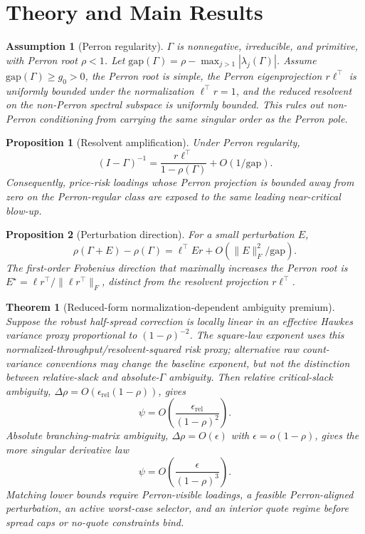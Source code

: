 \documentclass[11pt]{article}
\newtheorem{theorem}{Theorem}
\newtheorem{proposition}{Proposition}
\newtheorem{assumption}{Assumption}
\begin{document}
\section{Theory and Main Results}

\begin{assumption}[Perron regularity]
$\Gamma$ is nonnegative, irreducible, and primitive, with Perron root
$\rho<1$. Let
$\mathrm{gap}(\Gamma)=\rho-\max_{j>1}|\lambda_j(\Gamma)|$.
Assume $\mathrm{gap}(\Gamma)\ge g_0>0$, the Perron root is simple, the Perron
eigenprojection $r\ell^\top$ is uniformly bounded under the normalization
$\ell^\top r=1$, and the reduced resolvent on the non-Perron spectral subspace
is uniformly bounded. This rules out non-Perron conditioning from carrying the
same singular order as the Perron pole.
\end{assumption}

\begin{proposition}[Resolvent amplification]
Under Perron regularity,
\[
(I-\Gamma)^{-1}
 =
\frac{r\ell^\top}{1-\rho(\Gamma)} + O(1/\mathrm{gap}).
\]
Consequently, price-risk loadings whose Perron projection is bounded away from
zero on the Perron-regular class are exposed to the same leading near-critical
blow-up.
\end{proposition}

\begin{proposition}[Perturbation direction]
For a small perturbation $E$,
\[
\rho(\Gamma+E)-\rho(\Gamma)
 =
\ell^\top E r + O(\|E\|_F^2/\mathrm{gap}).
\]
The first-order Frobenius direction that maximally increases the Perron root is
$E^\star=\ell r^\top/\|\ell r^\top\|_F$, distinct from the resolvent projection
$r\ell^\top$.
\end{proposition}

\begin{theorem}[Reduced-form normalization-dependent ambiguity premium]
Suppose the robust half-spread correction is locally linear in an effective
Hawkes variance proxy proportional to $(1-\rho)^{-2}$. The square-law exponent
uses this normalized-throughput/resolvent-squared risk proxy; alternative raw
count-variance conventions may change the baseline exponent, but not the
distinction between relative-slack and absolute-$\Gamma$ ambiguity. Then relative
critical-slack
ambiguity, $\Delta\rho=O(\epsilon_{\mathrm{rel}}(1-\rho))$, gives
\[
\psi = O\!\left(\frac{\epsilon_{\mathrm{rel}}}{(1-\rho)^2}\right).
\]
Absolute branching-matrix ambiguity, $\Delta\rho=O(\epsilon)$ with
$\epsilon=o(1-\rho)$, gives the more singular derivative law
\[
\psi = O\!\left(\frac{\epsilon}{(1-\rho)^3}\right).
\]
Matching lower bounds require Perron-visible loadings, a feasible
Perron-aligned perturbation, an active worst-case selector, and an interior
quote regime before spread caps or no-quote constraints bind.
\end{theorem}
\end{document}
